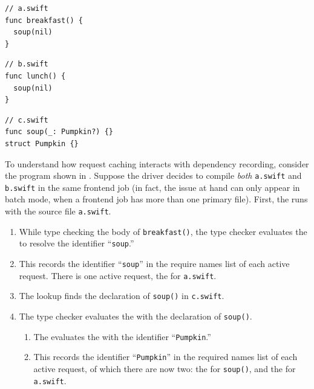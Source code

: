 \documentclass[../generics]{subfiles}
\begin{document}
\begin{listing}[b!]\label{dependencyexample}
\begin{Verbatim}
// a.swift
func breakfast() {
  soup(nil)
}
\end{Verbatim}
\begin{Verbatim}
// b.swift
func lunch() {
  soup(nil)
}
\end{Verbatim}
\begin{Verbatim}
// c.swift
func soup(_: Pumpkin?) {}
struct Pumpkin {}
\end{Verbatim}
\end{listing}

\begin{example}
To understand how request caching interacts with dependency recording, consider the program shown in . Suppose the driver decides to compile \emph{both} \texttt{a.swift} and \texttt{b.swift} in the same frontend job (in fact, the issue at hand can only appear in batch mode, when a frontend job has more than one primary file). First, the  runs with the source file \texttt{a.swift}.
\begin{enumerate}
\item While type checking the body of \texttt{breakfast()}, the type checker evaluates the  to resolve the identifier ``\texttt{soup}.''
\item This records the identifier ``\texttt{soup}'' in the require names list of each active request. There is one active request, the  for \texttt{a.swift}.
\item The lookup finds the declaration of \texttt{soup()} in \texttt{c.swift}.
\item The type checker evaluates the  with the declaration of \texttt{soup()}.
\begin{enumerate}
\item The  evaluates the  with the identifier ``\texttt{Pumpkin}.''
\item This records the identifier ``\texttt{Pumpkin}'' in the required names list of each active request, of which there are now two: the  for \texttt{soup()}, and the  for \texttt{a.swift}.
\end{enumerate}

\end{enumerate}
\end{example}
\end{document}
